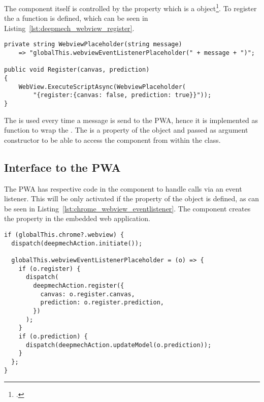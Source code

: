 The  component itself is controlled by the  property which is a  object\footnote{.}.
To register the  a  function is defined, which can be seen in Listing~\ref{lst:deepmech_webview_register}.

\begin{lstlisting}[label={lst:deepmech_webview_register}, caption={DeepmechWebView Register function}]
private string WebviewPlaceholder(string message)
    => "globalThis.webviewEventListenerPlaceholder(" + message + ")";

public void Register(canvas, prediction)
{
    WebView.ExecuteScriptAsync(WebviewPlaceholder(
        "{register:{canvas: false, prediction: true}}"));
}
\end{lstlisting}

The  is used every time a message is send to the PWA, hence it is implemented as function to wrap the .
The  is a property of the  object and passed as argument constructor to be able to access the  component from within the class.

\subsection{Interface to the PWA} \label{ch:interface_to_the_pwa}

The PWA has respective code in the  component to handle calls via an event listener.
This will be only activated if the  property of the  object is defined, as can be seen in Listing~\ref{lst:chrome_webview_eventlistener}.
The  component creates the  property in the embedded web application.

\begin{lstlisting}[label={lst:chrome_webview_eventlistener}, caption={PWA event-handler for the chrome webview}]
if (globalThis.chrome?.webview) {
  dispatch(deepmechAction.initiate());

  globalThis.webviewEventListenerPlaceholder = (o) => {
    if (o.register) {
      dispatch(
        deepmechAction.register({
          canvas: o.register.canvas,
          prediction: o.register.prediction,
        })
      );
    }
    if (o.prediction) {
      dispatch(deepmechAction.updateModel(o.prediction));
    }
  };
}
\end{lstlisting}

